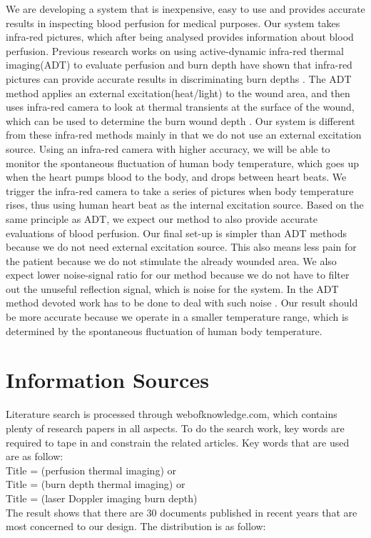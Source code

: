 \documentclass[paper=letter, fontsize=11pt]{scrartcl}
\numberwithin{equation}{section}		%
\numberwithin{figure}{section}			%
\numberwithin{table}{section}			%
\begin{document}
We are developing a system that is inexpensive, easy to use and provides accurate results in inspecting blood perfusion
for medical purposes. Our system takes infra-red pictures, which after being analysed provides information
about blood perfusion. Previous research works on using active-dynamic infra-red thermal imaging(ADT)
to evaluate perfusion and burn depth have shown that infra-red pictures can provide accurate results in
discriminating burn depths \cite{Renkielska}\cite{Ruminski}. The ADT method applies an external excitation(heat/light) to the wound area, and then uses
infra-red camera to look at thermal transients at the surface of the wound, which can be used to determine
the burn wound depth \cite{Renkielska}\cite{Ruminski}. Our system is different from these infra-red methods mainly in that
we do not use an external excitation source. Using an infra-red camera with higher accuracy, we will be able
to monitor the spontaneous fluctuation of human body temperature, which goes up when the heart pumps blood
to the body, and drops between heart beats. We trigger the infra-red camera to take a series of pictures
when body temperature rises, thus using human heart beat as the internal excitation source. Based on
the same principle as ADT, we expect our method to also provide accurate evaluations of blood perfusion. Our final
set-up is simpler than ADT methods because we do not need external excitation source. This also means less pain
for the patient because we do not stimulate the already wounded area. We also expect lower noise-signal ratio for
our method because we do not have to filter out the unuseful reflection signal, which is noise for the system. In
the ADT method devoted work has to be done to deal with such noise \cite{Ruminski}.
Our result should be more accurate because we operate in a smaller temperature range, which is determined by the
spontaneous fluctuation of human body temperature.

\section{Information Sources}
Literature search is processed through webofknowledge.com, which contains plenty of research papers in all aspects. To do the
search work, key words are required to tape in and constrain the related articles. Key words that are used are as follow:
\\Title = (perfusion thermal imaging) or 
\\Title = (burn depth thermal imaging) or
\\Title = (laser Doppler imaging burn depth)
\\The result shows that there are 30 documents published in recent years that are most concerned to our design. 
The distribution is as follow:
\end{document}
